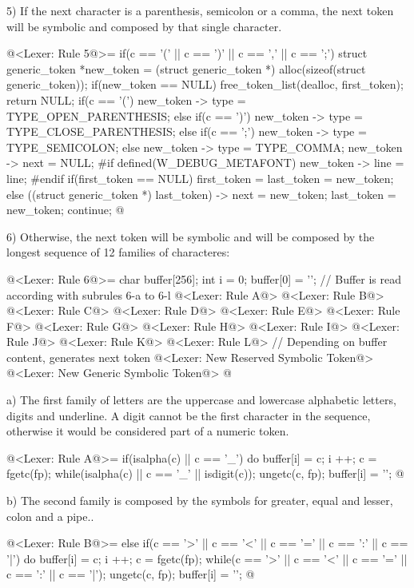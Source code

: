 5) If the next character is a parenthesis, semicolon or a comma, the
next token will be symbolic and composed by that single character.

\iniciocodigo
@<Lexer: Rule 5@>=
if(c == '(' || c == ')' || c == ',' || c == ';'){
  struct generic_token *new_token =
     (struct generic_token *) alloc(sizeof(struct generic_token));
  if(new_token == NULL){
    free_token_list(dealloc, first_token);
    return NULL;
  }
  if(c == '(')
    new_token -> type = TYPE_OPEN_PARENTHESIS;
  else if(c == ')')
    new_token -> type = TYPE_CLOSE_PARENTHESIS;
  else if(c == ';')
    new_token -> type = TYPE_SEMICOLON;
  else
    new_token -> type = TYPE_COMMA;
  new_token -> next = NULL;
#if defined(W_DEBUG_METAFONT)
  new_token -> line = line;
#endif
  if(first_token == NULL)
    first_token = last_token = new_token;
  else{
    ((struct generic_token *) last_token) -> next = new_token;
    last_token = new_token;
  }
  continue;
}
@
\fimcodigo

6) Otherwise, the next token will be symbolic and will be composed by
the longest sequence of 12 families of characteres:

\iniciocodigo
@<Lexer: Rule 6@>=
{
  char buffer[256];
  int i = 0;
  buffer[0] = '\0';
  // Buffer is read according with subrules 6-a to 6-l
  @<Lexer: Rule A@>
  @<Lexer: Rule B@>
  @<Lexer: Rule C@>
  @<Lexer: Rule D@>
  @<Lexer: Rule E@>
  @<Lexer: Rule F@>
  @<Lexer: Rule G@>
  @<Lexer: Rule H@>
  @<Lexer: Rule I@>
  @<Lexer: Rule J@>
  @<Lexer: Rule K@>
  @<Lexer: Rule L@>
  // Depending on buffer content, generates next token
  @<Lexer: New Reserved Symbolic Token@>
  @<Lexer: New Generic Symbolic Token@>
}
@
\fimcodigo

a) The first family of letters are the uppercase and lowercase
alphabetic letters, digits and underline. A digit cannot be the first
character in the sequence, otherwise it would be considered part of a
numeric token.

\iniciocodigo
@<Lexer: Rule A@>=
if(isalpha(c) || c == '_'){
  do{
    buffer[i] = c;
    i ++;
    c = fgetc(fp);
  } while(isalpha(c) || c == '_' || isdigit(c));
  ungetc(c, fp);
  buffer[i] = '\0';
}
@
\fimcodigo

b) The second family is composed by the symbols for greater, equal and
lesser, colon and a pipe..

\iniciocodigo
@<Lexer: Rule B@>=
else if(c == '>' || c == '<' || c == '=' || c == ':' || c == '|'){
  do{
    buffer[i] = c;
    i ++;
    c = fgetc(fp);
  } while(c == '>' || c == '<' || c == '=' || c == ':' || c == '|');
  ungetc(c, fp);
  buffer[i] = '\0';
}
@
\fimcodigo

